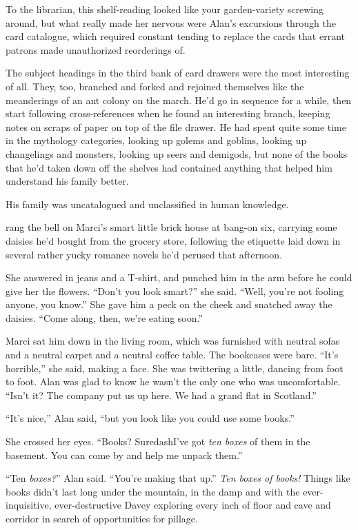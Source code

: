 To the librarian, this shelf-reading looked like your garden-variety
screwing around, but what really made her nervous were Alan's
excursions through the card catalogue, which required constant tending
to replace the cards that errant patrons made unauthorized reorderings
of.

The subject headings in the third bank of card drawers were the most
interesting of all.  They, too, branched and forked and rejoined
themselves like the meanderings of an ant colony on the march.  He'd
go in sequence for a while, then start following cross-references when
he found an interesting branch, keeping notes on scraps of paper on
top of the file drawer.  He had spent quite some time in the mythology
categories, looking up golems and goblins, looking up changelings and
monsters, looking up seers and demigods, but none of the books that
he'd taken down off the shelves had contained anything that helped him
understand his family better.

His family was uncatalogued and unclassified in human knowledge.

 rang the bell on Marci's smart little brick house at bang-on six,
carrying some daisies he'd bought from the grocery store, following
the etiquette laid down in several rather yucky romance novels he'd
perused that afternoon.

She answered in jeans and a T-shirt, and punched him in the arm before
he could give her the flowers.  ``Don't you look smart?'' she said. 
``Well, you're not fooling anyone, you know.'' She gave him a peck on
the cheek and snatched away the daisies.  ``Come along, then, we're
eating soon.''

Marci sat him down in the living room, which was furnished with
neutral sofas and a neutral carpet and a neutral coffee table.  The
bookcases were bare.  ``It's horrible,'' she said, making a face.  She
was twittering a little, dancing from foot to foot.  Alan was glad to
know he wasn't the only one who was uncomfortable.  ``Isn't it?  The
company put us up here.  We had a grand flat in Scotland.''

``It's nice,'' Alan said, ``but you look like you could use some
books.''

She crossed her eyes.  ``Books?  Suredash{}I've got \textit{ten boxes} of
them in the basement.  You can come by and help me unpack them.''

``Ten \textit{boxes?}'' Alan said.  ``You're making that up.''
\textit{Ten boxes of books!} Things like books didn't last long under
the mountain, in the damp and with the ever-inquisitive,
ever-destructive Davey exploring every inch of floor and cave and
corridor in search of opportunities for pillage.

